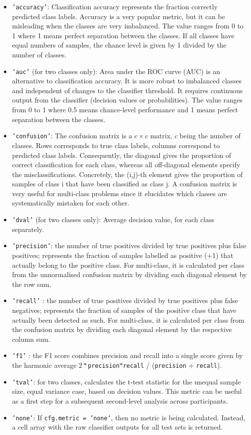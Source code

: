 \documentclass[utf8]{frontiersSCNS} %
\newcommand{\ttt}[1]{\texttt{#1}}
\begin{document}
\begin{itemize}
    \item \ttt{'accuracy'}: Classification accuracy represents the fraction correctly predicted class labels. Accuracy is a very popular metric, but it can be misleading when the classes are very imbalanced. The value ranges from 0 to 1 where 1 means perfect separation between the classes. If all classes have equal numbers of samples, the chance level is given by 1 divided by the number of classes.
    \item \ttt{'auc'} (for two classes only): Area under the ROC curve (AUC) is an alternative to classification accuracy. It is more robust to imbalanced classes and independent of changes to the classifier threshold. It requires continuous output from the classifier (decision values or probabilities). The value ranges from 0 to 1 where 0.5 means chance-level performance and 1 means perfect separation between the classes.
    \item \ttt{'confusion'}: The confusion matrix is a $c\times c$ matrix, $c$ being the number of classes. Rows corresponds to true class labels, columns correspond to predicted class labels. Consequently, the diagonal gives the proportion of correct classification for each class, whereas all off-diagonal elements specify the misclassifications. Concretely, the (i,j)-th element gives the proportion of samples of class i that have been classified as class j. A confusion matrix is very useful for multi-class problems since it elucidates which classes are systematically mistaken for each other.
    \item \ttt{'dval'} (for two classes only): Average decision value, for each class separately.
    \item \ttt{'precision'}: the number of true positives divided by true positives plus false positives; represents the fraction of samples labelled as positive (+1) that actually belong to the positive class. For multi-class, it is calculated per class from the unnormalised confusion matrix by dividing each diagonal element by the row sum.
    \item \ttt{'recall'} : the number of true positives divided by true positives plus false negatives; represents the fraction of samples of the positive class that have actually been detected as such. For multi-class, it is calculated per class from the confusion matrix by dividing each diagonal element by the respective column sum.
    \item \ttt{'f1'} : the F1 score combines precision and recall into a single score given by the harmonic average $2*$\ttt{precision}$*$\ttt{recall} / (\ttt{precision} + \ttt{recall}).
    \item \ttt{'tval'}: for two classes, calculates the t-test statistic for the unequal sample size, equal variance case, based on decision values. This metric can be useful as a first step for a subsequent second-level analysis across participants.
    \item \ttt{'none'}: If \ttt{cfg.metric = 'none'}, then no metric is being calculated. Instead, a cell array with the raw classifier outputs for all test sets is returned.
\end{itemize}
\end{document}
